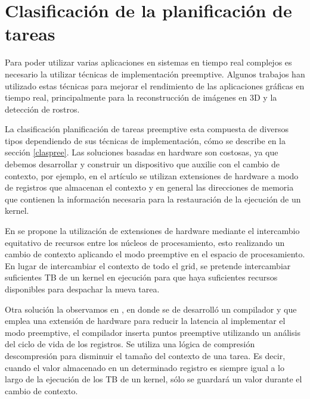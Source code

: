 \section{Clasificación de la planificación de tareas}
	
	Para poder utilizar varias aplicaciones en sistemas en tiempo real complejos es necesario la utilizar técnicas de implementación preemptive. Algunos trabajos han utilizado estas técnicas para mejorar el rendimiento de las aplicaciones gráficas en tiempo real, principalmente para la reconstrucción de imágenes en 3D y la detección de rostros.

\vspace{0.3cm}

La clasificación planificación de tareas preemptive esta compuesta de diversos tipos dependiendo de sus técnicas de implementación, cómo se describe en la sección \ref{claspree}. 
Las soluciones basadas en hardware son costosas, ya que debemos desarrollar y construir un dispositivo que auxilie con el cambio de contexto, por ejemplo, en el artículo \cite{18} se utilizan extensiones de hardware a modo de registros que almacenan el contexto y en general las direcciones de memoria que contienen la información necesaria para la restauración de la ejecución de un kernel. 

\vspace{0.3cm}

En \cite{20} se propone la utilización de extensiones de hardware mediante el intercambio equitativo de recursos entre los núcleos de procesamiento, esto realizando un cambio de contexto aplicando el modo preemptive en el espacio de procesamiento. En lugar de intercambiar el contexto de todo el grid, se pretende intercambiar suficientes TB de un kernel en ejecución para que haya suficientes recursos disponibles para despachar la nueva tarea. 

\vspace{0.3cm}

Otra solución la observamos en \cite{8}, en donde se de desarrolló un compilador y que emplea una extensión de hardware para reducir la latencia al implementar el modo preemptive, el compilador inserta puntos preemptive utilizando un análisis del ciclo de vida de los registros. Se utiliza una lógica de compresión descompresión para disminuir el tamaño del contexto de una tarea. Es decir, cuando el valor almacenado en un determinado registro es siempre igual a lo largo de la ejecución de los TB de un kernel, sólo se guardará un valor durante el cambio de contexto.

